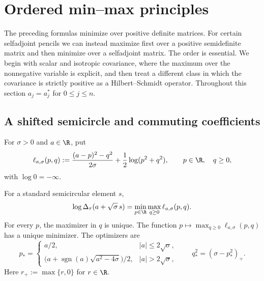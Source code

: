 \section{Ordered min--max principles}\label{sec:ordered-minmax}

The preceding formulas minimize over positive definite matrices.
For certain selfadjoint pencils we can instead maximize first over a positive semidefinite matrix and then minimize over a selfadjoint matrix.
The order is essential.
We begin with scalar and isotropic covariance, where the maximum over the nonnegative variable is explicit, and then treat a different class in which the covariance is strictly positive as a Hilbert--Schmidt operator.
Throughout this section $a_j=a_j^*$ for $0\le j\le n$.

\subsection{A shifted semicircle and commuting coefficients}

For $\sigma>0$ and $a\in\R$, put
\begin{equation}\label{eq:minmax-scalar-action}
 \ell_{a,\sigma}(p,q)
 :=\frac{(a-p)^2-q^2}{2\sigma}
      +\frac12\log(p^2+q^2),
 \qquad p\in\R,\quad q\ge0,
\end{equation}
with $\log0=-\infty$.

\begin{proposition}\label{prop:minmax-scalar}
For a standard semicircular element $s$,
\begin{equation}\label{eq:minmax-scalar}
 \log\Delta_\tau(a+\sqrt\sigma\,s)
   =\min_{p\in\R}\max_{q\ge0}\ell_{a,\sigma}(p,q).
\end{equation}
For every $p$, the maximizer in $q$ is unique.
The function $p\mapsto\max_{q\ge0}\ell_{a,\sigma}(p,q)$ has a unique minimizer.
The optimizers are
\begin{equation}\label{eq:minmax-scalar-optimizer}
 p_*=
 \begin{cases}
  a/2,&|a|\le2\sqrt\sigma,\\
  \bigl(a+\operatorname{sgn}(a)\sqrt{a^2-4\sigma}\bigr)/2,
      &|a|>2\sqrt\sigma,
 \end{cases}
 \qquad q_*^2=(\sigma-p_*^2)_+.
\end{equation}
Here $r_+:=\max\{r,0\}$ for $r\in\R$.
\end{proposition}

